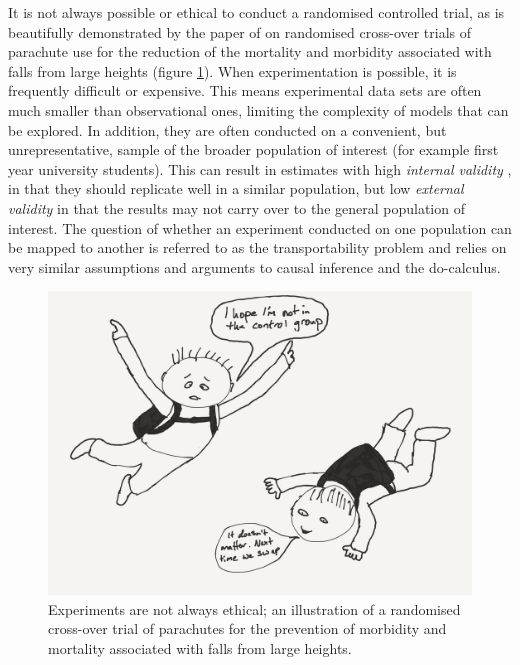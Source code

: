 \documentclass[11pt,a4paper,twoside]{report}
\theoremstyle{plain}
\theoremstyle{definition}
\begin{document}
It is not always possible or ethical to conduct a randomised controlled trial, as is beautifully demonstrated by the paper of \citet{smith2003parachute} on randomised cross-over trials of parachute use for the reduction of the mortality and morbidity associated with falls from large heights (figure \ref{fig:parashute}). When experimentation is possible, it is frequently difficult or expensive. This means experimental data sets are often much smaller than observational ones, limiting the complexity of models that can be explored. In addition, they are often conducted on a convenient, but unrepresentative, sample of the broader population of interest (for example first year university students). This can result in estimates with high \emph{internal validity} \citep{Campbell1963}, in that they should replicate well in a similar population, but low \emph{external validity} in that the results may not carry over to the general population of interest. The question of whether an experiment conducted on one population can be mapped to another is referred to as the transportability problem \citep{Bareinboim2013} and relies on very similar assumptions and arguments to causal inference and the do-calculus. 

\begin{figure}
\begin{center}
\includegraphics[scale=.4]{double_blind_parashute_trial_cartoon.png}
\end{center}
\caption{Experiments are not always ethical; an illustration of a randomised cross-over trial of parachutes for the prevention of morbidity and mortality associated with falls from large heights.}
\label{fig:parashute}
\end{figure}
\end{document}
